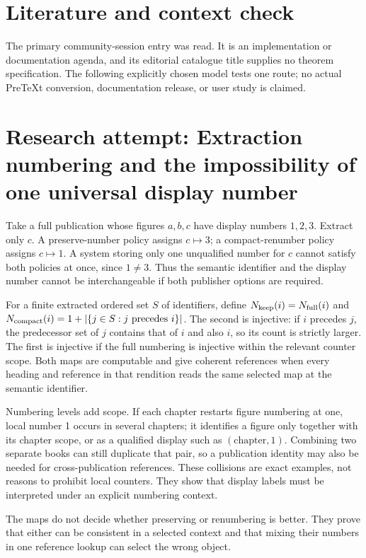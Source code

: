 \documentclass[11pt]{article}
\begin{document}
\section{Literature and context check}
The primary community-session entry was read. It is an implementation or documentation agenda, and its editorial catalogue title supplies no theorem specification. The following explicitly chosen model tests one route; no actual PreTeXt conversion, documentation release, or user study is claimed.
\section{Research attempt: Extraction numbering and the impossibility of one universal display number}
Take a full publication whose figures $a,b,c$ have display numbers $1,2,3$. Extract only $c$. A preserve-number policy assigns $c\mapsto3$; a compact-renumber policy assigns $c\mapsto1$. A system storing only one unqualified number for $c$ cannot satisfy both policies at once, since $1\ne3$. Thus the semantic identifier and the display number cannot be interchangeable if both publisher options are required.

For a finite extracted ordered set $S$ of identifiers, define $N_{\rm keep}(i)=N_{\rm full}(i)$ and $N_{\rm compact}(i)=1+|\{j\in S:j\text{ precedes }i\}|$. The second is injective: if $i$ precedes $j$, the predecessor set of $j$ contains that of $i$ and also $i$, so its count is strictly larger. The first is injective if the full numbering is injective within the relevant counter scope. Both maps are computable and give coherent references when every heading and reference in that rendition reads the same selected map at the semantic identifier.

Numbering levels add scope. If each chapter restarts figure numbering at one, local number 1 occurs in several chapters; it identifies a figure only together with its chapter scope, or as a qualified display such as $(\text{chapter},1)$. Combining two separate books can still duplicate that pair, so a publication identity may also be needed for cross-publication references. These collisions are exact examples, not reasons to prohibit local counters. They show that display labels must be interpreted under an explicit numbering context.

The maps do not decide whether preserving or renumbering is better. They prove that either can be consistent in a selected context and that mixing their numbers in one reference lookup can select the wrong object.
\end{document}
